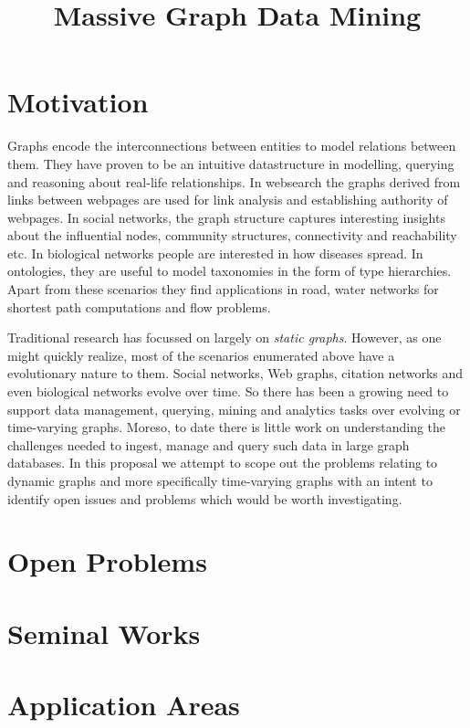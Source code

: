 \documentclass{scrartcl}
\begin{document}
  
  \title{Massive Graph Data Mining}
  \maketitle
    
\section{Motivation}

Graphs encode the interconnections between entities to model relations between them. They have proven to be an intuitive datastructure in modelling, querying and reasoning about real-life relationships. In websearch the graphs derived from links between webpages are used for link analysis and establishing authority of webpages. In social networks, the graph structure captures interesting insights about the influential nodes, community structures, connectivity and reachability etc. In biological networks people are interested in how diseases spread. In ontologies, they are useful to model taxonomies in the form of type hierarchies. Apart from these scenarios they find applications in road, water networks for shortest path computations and flow problems. 

Traditional research has focussed on largely on \emph{static graphs}. However, as one might quickly realize, most of the scenarios enumerated above have a evolutionary nature to them. Social networks, Web graphs, citation networks and even biological networks evolve over time. So there has been a growing need to support data management, querying, mining and analytics tasks over evolving or time-varying graphs.  Moreso, to date there is little work on understanding the challenges needed to ingest, manage and query such data in large graph databases. In this proposal we attempt to scope out the problems relating to dynamic graphs and more specifically time-varying graphs with an intent to identify open issues and problems which would be worth investigating.




\section{Open Problems}


\section{Seminal Works}


\section{Application Areas}
\end{document}
